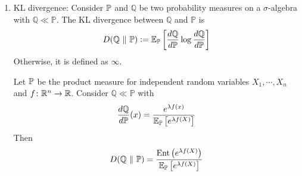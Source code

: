 \begin{enumerate}[label=\arabic{*}.]
\begin{proof}
\begin{equation*}
	    	\frac{d}{\lambda}\bc{\frac{g(\lambda)}{\lambda}} \leq \frac{v}{2}~\Rightarrow~ \frac{g(\lambda)}{\lambda} - \lim_{x \sto 0} \frac{g(x)}{x} \leq \frac{\lambda}{2}v
	    \end{equation*}
	    But because $g(0) = $, $\lim_{x \sto 0} \frac{g(x)}{x} = g^\prime(0) = 0$,
	    \begin{equation*}
	    	g(\lambda) \leq \frac{\lambda^2}{2}v \qedhere
	    \end{equation*}
	\end{proof}
	\begin{rmk}
	    The condition
	    \begin{equation*}
	    	\op{Ent}(Y) \leq \frac{\lambda^2 v}{2}\E[Y],\quad \forall~ \lambda \geq 0
	    \end{equation*}
	    is called the Herbst's condition.
	\end{rmk}

	\item KL divergence: Consider $\mathbb{P}$ and $\mathbb{Q}$ be two probability measures on a $\sigma$-algebra with $\mathbb{Q} \ll \mathbb{P}$. The KL divergence between $\mathbb{Q}$ and $\mathbb{P}$ is
	\begin{equation*}
		D(\mathbb{Q} ~\Vert~ \mathbb{P}) \vcentcolon= \mathbb{E}_{\mathbb{P}}\left[\frac{d\mathbb{Q}}{d\mathbb{P}}\log \frac{d\mathbb{Q}}{d\mathbb{P}}\right]
	\end{equation*}
	Otherwise, it is defined as $\infty$.

	\begin{lem}
	    Let $\mathbb{P}$ be the product measure for independent random variables $X_1,\cdots,X_n$ and $f \colon \mathbb{R}^n \rightarrow \mathbb{R}$. Consider $\mathbb{Q} \ll \mathbb{P}$ with
	    \begin{equation*}
	    	\frac{d\mathbb{Q}}{d\mathbb{P}}(x) = \frac{e^{\lambda f(x)}}{\mathbb{E}_{\mathbb{P}}\left[e^{\lambda f(X)}\right]}
	    \end{equation*}
	    Then
	    \begin{equation*}
	    	D(\mathbb{Q} ~\Vert~ \mathbb{P}) = \frac{\operatorname{Ent}\left(e^{\lambda f(X)}\right)}{\mathbb{E}_{\mathbb{P}}\left[e^{\lambda f(X)}\right]}
	    \end{equation*}
	\end{lem}
	

\end{enumerate}
